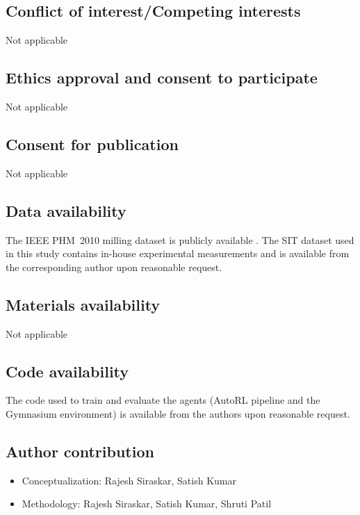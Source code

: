 \documentclass[sn-basic]{sn-jnl} %
\begin{document}
\subsection*{Conflict of interest/Competing interests}
Not applicable

\subsection*{Ethics approval and consent to participate}
Not applicable

\subsection*{Consent for publication}
Not applicable

\subsection*{Data availability}
The IEEE PHM~2010 milling dataset is publicly available \cite{PHMdata2010}. The SIT dataset used in this study contains in-house experimental measurements and is available from the corresponding author upon reasonable request.

\subsection*{Materials availability}
Not applicable

\subsection*{Code availability}
The code used to train and evaluate the agents (AutoRL pipeline and the Gymnasium environment) is available from the authors upon reasonable request.

\subsection*{Author contribution}
\begin{itemize}
		\item Conceptualization: Rajesh Siraskar, Satish Kumar
		\item Methodology: Rajesh Siraskar, Satish Kumar, Shruti Patil
\end{itemize}
\end{document}
